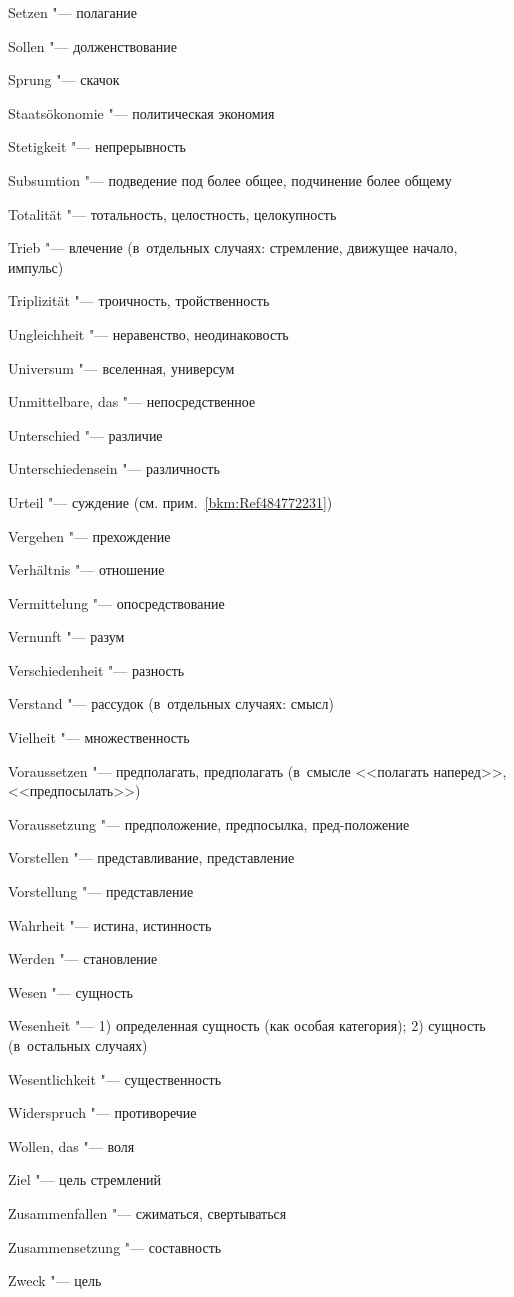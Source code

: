 \begin{multicols}{2}
Setzen "--- полагание

Sollen "--- долженствование

Sprung "--- скачок

Staats\-ökonomie "--- политическая экономия

Stetigkeit "--- непрерывность

Subsumtion "--- подведение под более общее, подчинение более общему

\bigskip

Totalität "--- тотальность, целостность, целокупность

Trieb "--- влечение (в~отдельных случаях: стремление, движущее начало, импульс)

Triplizität "--- троичность, тройственность

\bigskip

Ungleich\-heit "--- неравенство, неодинаковость

Universum "--- вселенная, универсум

Unmittel\-bare, das "--- непосредственное

Unter\-schied "--- различие

Unter\-schie\-densein "--- различность

Urteil "--- суждение (см. прим.~\ref{bkm:Ref484772231})

\bigskip

Vergehen "--- прехождение

Verhältnis "--- отношение

Vermit\-telung "--- опосредствование

Vernunft "--- разум

Ver\-schieden\-heit "--- разность

Verstand "--- рассудок (в~отдельных случаях: смысл)

Vielheit "--- множественность

Voraus\-setzen "--- предполагать, предполагать (в~смысле <<полагать
наперед>>, <<предпосылать>>)

Voraus\-setzung "--- предположение, предпосылка, пред-положение

Vor\-stellen "--- представливание, представление

Vor\-stellung "--- представление

\bigskip

Wahrheit "--- истина, истинность

Werden "--- становление

Wesen "--- сущность

Wesen\-heit "--- 1) определенная сущность (как особая категория);
2) сущность (в~остальных случаях)

Wesent\-lich\-keit "--- существенность

Widers\-pruch "--- противоречие

Wollen, das "--- воля

\bigskip

Ziel "--- цель стремлений

Zusammen\-fallen "--- сжиматься, свертываться

Zusammen\-setzung "--- составность

Zweck "--- цель
\end{multicols}

